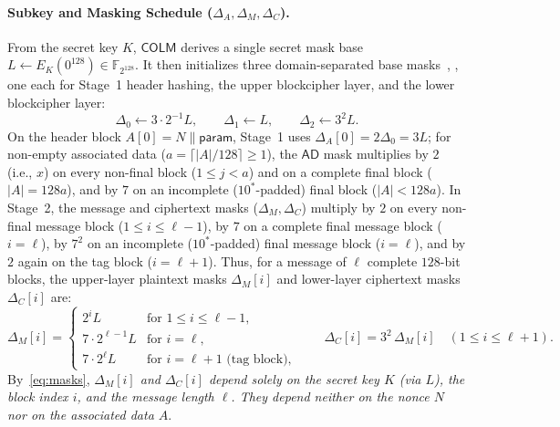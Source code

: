 \documentclass[11pt,a4paper]{article}
\theoremstyle{definition}
\theoremstyle{remark}
\newcommand{\FtwoN}{\mathbb{F}_{2^{128}}}
\newcommand{\COLM}{\mathsf{COLM}}
\newcommand{\AD}{\mathsf{AD}}
\begin{document}
\paragraph{Subkey and Masking Schedule ($\Delta_A, \Delta_M, \Delta_C$).}
From the secret key $K$, $\COLM$ derives a single secret mask base $L \leftarrow E_K(0^{128}) \in \FtwoN$. It then initializes three domain-separated base masks~\cite[Section~1.4, pp.~4--5]{COLMv1}, \cite[Figures~2--3, pp.~11--12]{COLM24}, one each for Stage~1 header hashing, the upper blockcipher layer, and the lower blockcipher layer:
\begin{equation}
\label{eq:base-masks}
\Delta_0 \leftarrow 3 \cdot 2^{-1} L, \qquad \Delta_1 \leftarrow L, \qquad \Delta_2 \leftarrow 3^2 L.
\end{equation}
On the header block $A[0] = N \parallel \mathsf{param}$, Stage~1 uses $\Delta_A[0] = 2\Delta_0 = 3L$; for non-empty associated data ($a = \lceil |A|/128 \rceil \ge 1$), the $\AD$ mask multiplies by $2$ (i.e., $x$) on every non-final block ($1 \le j < a$) and on a complete final block ($|A| = 128a$), and by $7$ on an incomplete ($10^*$-padded) final block ($|A| < 128a$). In Stage~2, the message and ciphertext masks ($\Delta_M, \Delta_C$) multiply by $2$ on every non-final message block ($1 \le i \le \ell - 1$), by $7$ on a complete final message block ($i = \ell$), by $7^2$ on an incomplete ($10^*$-padded) final message block ($i = \ell$), and by $2$ again on the tag block ($i = \ell + 1$). Thus, for a message of $\ell$ complete $128$-bit blocks, the upper-layer plaintext masks $\Delta_M[i]$ and lower-layer ciphertext masks $\Delta_C[i]$ are:
\begin{equation}
\label{eq:masks}
\Delta_M[i] = \begin{cases}
2^i L & \text{for } 1 \le i \le \ell - 1, \\
7 \cdot 2^{\ell-1} L & \text{for } i = \ell, \\
7 \cdot 2^\ell L & \text{for } i = \ell + 1 \text{ (tag block)},
\end{cases}
\qquad
\Delta_C[i] = 3^2 \, \Delta_M[i] \quad (1 \le i \le \ell + 1).
\end{equation}
By~\eqref{eq:masks}, \emph{$\Delta_M[i]$ and $\Delta_C[i]$ depend solely on the secret key $K$ (via $L$), the block index $i$, and the message length $\ell$. They depend neither on the nonce $N$ nor on the associated data $A$}.
\end{document}
